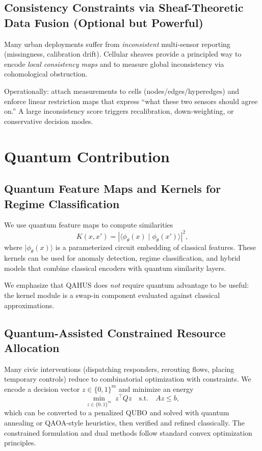 \documentclass[11pt]{article}
\begin{document}
\subsection{Consistency Constraints via Sheaf-Theoretic Data Fusion (Optional but Powerful)}
Many urban deployments suffer from \emph{inconsistent} multi-sensor reporting (missingness, calibration drift).
Cellular sheaves provide a principled way to encode \emph{local consistency maps} and to measure global
inconsistency via cohomological obstruction. \citep{curry2014sheaves,hansen2019spectral}

Operationally: attach measurements to cells (nodes/edges/hyperedges) and enforce linear restriction maps
that express ``what these two sensors should agree on.'' A large inconsistency score triggers recalibration,
down-weighting, or conservative decision modes.

\section{Quantum Contribution}

\subsection{Quantum Feature Maps and Kernels for Regime Classification}
We use quantum feature maps to compute similarities
\[
K(x,x') = \left|\langle \phi_\theta(x) \mid \phi_\theta(x') \rangle\right|^2,
\]
where $\lvert \phi_\theta(x)\rangle$ is a parameterized circuit embedding of classical features.
These kernels can be used for anomaly detection, regime classification, and hybrid models that combine
classical encoders with quantum similarity layers. \citep{havlicek2019supervised,schuld2019qkernel}

We emphasize that QAHUS does \emph{not} require quantum advantage to be useful: the kernel module is a swap-in
component evaluated against classical approximations.

\subsection{Quantum-Assisted Constrained Resource Allocation}
Many civic interventions (dispatching responders, rerouting flows, placing temporary controls) reduce to
combinatorial optimization with constraints. We encode a decision vector $z\in\{0,1\}^m$ and minimize an
energy
\[
\min_{z\in\{0,1\}^m}\; z^\top Q z \quad \text{s.t.}\quad Az \le b,
\]
which can be converted to a penalized QUBO and solved with quantum annealing or QAOA-style heuristics,
then verified and refined classically. The constrained formulation and dual methods follow standard convex
optimization principles. \citep{boyd2004convex,rubinstein2004crossentropy}
\end{document}
